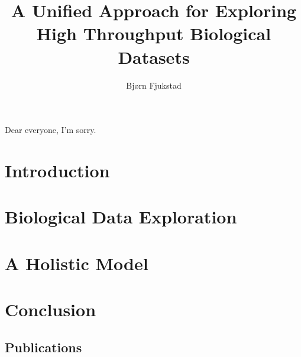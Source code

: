 \documentclass[USenglish,phd]{uit-thesis}
\begin{document}
 

\title{A Unified Approach for Exploring High Throughput Biological Datasets}
\author{Bjørn Fjukstad}
\maketitle

\begin{dedication}
    Dear everyone, I'm sorry.
\end{dedication}

\frontmatter
 
 

\tableofcontents
\mainmatter

\chapter{Introduction}
 

\chapter{Biological Data Exploration}


\chapter{A Holistic Model} 


\chapter{Conclusion}
 

\appendix
\begin{appendix}
    \chapter{Publications}
\end{appendix}
\end{document}
